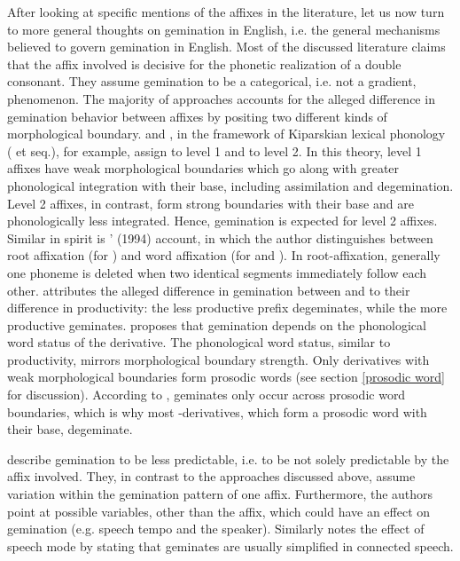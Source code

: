 After looking at specific mentions of the affixes in the literature, let us now turn to more general thoughts on gemination in English, i.e. the general mechanisms believed to govern gemination in English. 
Most of the discussed literature claims that the affix involved is decisive for the phonetic realization of a double consonant. They assume gemination to be a categorical, i.e. not a gradient, phenomenon. The majority of approaches accounts for the alleged difference in gemination behavior between affixes by positing two different kinds of morphological boundary. \citet[18]{Mohanan.1986} and \citet[119 ff]{Borowsky.1986}, in the framework of Kiparskian lexical phonology (\citealt{Kiparsky.1982} et seq.), for example, assign  to level 1 and  to level 2. In this theory, level 1 affixes have weak morphological boundaries which go along with greater phonological integration with their base, including assimilation and degemination. Level 2 affixes, in contrast, form strong boundaries with their base and are phonologically less integrated. Hence, gemination is expected for level 2 affixes. Similar in spirit is \citeauthor{Harris.1994}' (1994) account, in which the author distinguishes between root affixation (for ) and word affixation (for  and ). In root-affixation, generally one phoneme is deleted when two identical segments immediately follow each other. 
\cite{CohenGoldberg.2013} attributes the alleged difference in gemination between  and  to their difference in  productivity: the less productive prefix  degeminates, while the more productive  geminates. 
\citet[354]{Giegerich.2012} proposes that gemination depends on the phonological word status of the derivative. The phonological word status, similar to productivity, mirrors morphological boundary strength. Only derivatives with weak morphological boundaries form prosodic words (see section \ref{prosodic word} for discussion). According to \cite{Giegerich.2012}, geminates only occur across prosodic word boundaries, which is why most -derivatives, which form a prosodic word with their base, degeminate.

\citet[169]{Bauer.2013} describe gemination to be less predictable, i.e.  to be not solely  predictable by the affix involved. They, in contrast to the approaches discussed above, assume variation within the gemination pattern of one affix. Furthermore, the authors point at possible variables, other than the affix, which could have an effect on gemination (e.g. speech tempo and the speaker). Similarly \citet[191, 288]{Giegerich.1992} notes the effect of speech mode by stating that geminates are usually simplified in connected speech.
 
